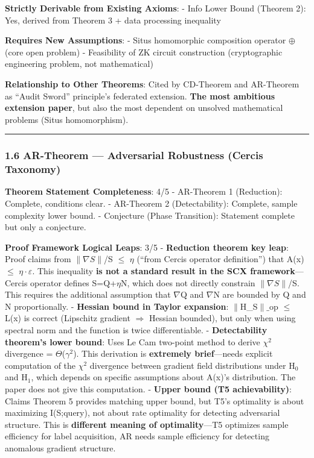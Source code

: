 \documentclass[
  12pt,
]{article}
\begin{document}
\textbf{Strictly Derivable from Existing Axioms}:
- Info Lower Bound (Theorem 2): Yes, derived from Theorem 3 + data processing inequality

\textbf{Requires New Assumptions}:
- Situs homomorphic composition operator $\oplus$ (core open problem)
- Feasibility of ZK circuit construction (cryptographic engineering problem, not mathematical)

\textbf{Relationship to Other Theorems}: Cited by CD-Theorem and AR-Theorem as ``Audit Sword'' principle's federated extension. \textbf{The most ambitious extension paper}, but also the most dependent on unsolved mathematical problems (Situs homomorphism).

\begin{center}\rule{0.5\linewidth}{0.5pt}\end{center}

\subsubsection{1.6 AR-Theorem --- Adversarial Robustness (Cercis Taxonomy)}\label{ar-theorem}

\textbf{Theorem Statement Completeness}: 4/5
- AR-Theorem 1 (Reduction): Complete, conditions clear.
- AR-Theorem 2 (Detectability): Complete, sample complexity lower bound.
- Conjecture (Phase Transition): Statement complete but only a conjecture.

\textbf{Proof Framework Logical Leaps}: 3/5
- \textbf{Reduction theorem key leap}: Proof claims from $\|\nabla S\|$/S $\leq$ $\eta$ (``from Cercis operator definition'') that A(x) $\leq$ $\eta\cdot\varepsilon$. This inequality \textbf{is not a standard result in the SCX framework}---Cercis operator defines S=Q+$\eta$N, which does not directly constrain $\|\nabla S\|$/S. This requires the additional assumption that $\nabla$Q and $\nabla$N are bounded by Q and N proportionally.
- \textbf{Hessian bound in Taylor expansion}: $\|$H\_S$\|\_\text{op}$ $\leq$ L(x) is correct (Lipschitz gradient $\Rightarrow$ Hessian bounded), but only when using spectral norm and the function is twice differentiable.
- \textbf{Detectability theorem's lower bound}: Uses Le Cam two-point method to derive $\chi^2$ divergence = $\Theta$($\gamma^2$). This derivation is \textbf{extremely brief}---needs explicit computation of the $\chi^2$ divergence between gradient field distributions under H$_0$ and H$_1$, which depends on specific assumptions about A(x)'s distribution. The paper does not give this computation.
- \textbf{Upper bound (T5 achievability)}: Claims Theorem 5 provides matching upper bound, but T5's optimality is about maximizing I(S;query), not about rate optimality for detecting adversarial structure. This is \textbf{different meaning of optimality}---T5 optimizes sample efficiency for label acquisition, AR needs sample efficiency for detecting anomalous gradient structure.
\end{document}
